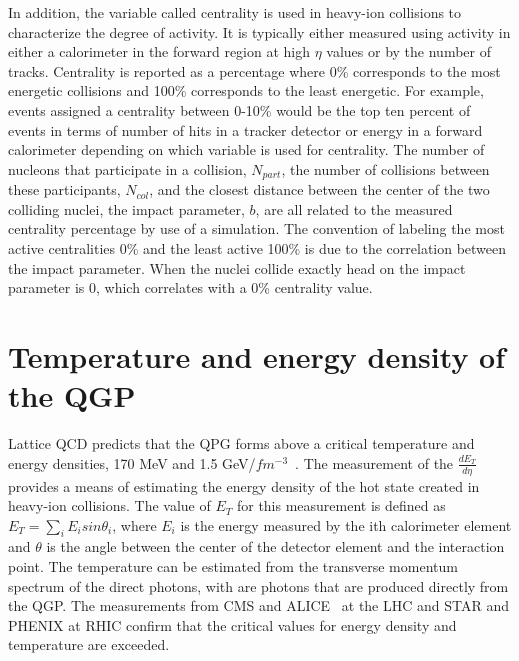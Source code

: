     In addition, the variable called centrality is used in heavy-ion 
      collisions to characterize the degree of activity. 
    It is typically either measured using activity in either a calorimeter in
      the forward region at high $\eta$ values or by the number of tracks.
    Centrality is reported as a percentage where 0\% corresponds to the most 
      energetic collisions and 100\% corresponds to the least energetic.
    For example, events assigned a centrality between 0-10\% would be the 
      top ten percent of events in terms of number of hits in a tracker 
      detector or energy in a forward calorimeter depending on which 
      variable is used for centrality. 
    The number of nucleons that participate in a collision, $N_{part}$,
      the number of collisions between these participants, $N_{col}$, and the
      closest distance between the center of the two colliding nuclei, the 
      impact parameter, $b$, are all related to the measured centrality 
      percentage by use of a simulation. 
    The convention of labeling the most active centralities 0\% and the least
      active 100\% is due to the correlation between the impact parameter.
    When the nuclei collide exactly head on the impact parameter is 0, which 
      correlates with a 0\% centrality value. 

  \section{Temperature and energy density of the QGP}
    Lattice QCD predicts that the QPG forms above a critical temperature and 
      energy densities, 170 MeV and 1.5 GeV/$fm$$^{-3}$~\cite{Karsch:2000kv,Hands:2001ve}.
    The measurement of the $\frac{dE_{T}}{d\eta}$ provides a means of 
      estimating the energy density of the hot state created in heavy-ion
      collisions. 
    The value of $E_{T}$ for this measurement is defined as 
      $E_{T}=\sum_{i}E_{i}sin\theta_{i}$, where $E_{i}$ is the energy measured 
      by the ith calorimeter element and $\theta$ is the angle between the 
      center of the detector element and the interaction point. 
    The temperature can be estimated from the transverse momentum 
      spectrum of the direct photons, with are photons that are produced 
      directly from the QGP.
    The measurements from CMS and ALICE~\cite{Aamodt:2008zz} at the LHC and STAR and PHENIX at RHIC
      confirm that the critical values for energy density and temperature are
      exceeded.

